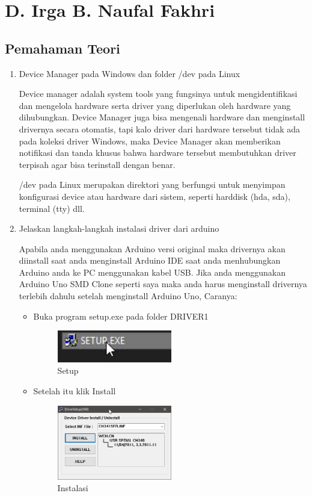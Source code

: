 \section{D. Irga B. Naufal Fakhri}
\subsection{Pemahaman Teori}
\begin{enumerate}
\item Device Manager pada Windows dan folder /dev pada Linux

Device manager adalah system tools yang fungsinya untuk mengidentifikasi dan mengelola hardware serta driver yang diperlukan oleh hardware yang dihubungkan. Device Manager juga bisa mengenali hardware dan menginstall drivernya secara otomatis, tapi kalo driver dari hardware tersebut tidak ada pada koleksi driver Windows, maka Device Manager akan memberikan notifikasi dan tanda khusus bahwa hardware tersebut membutuhkan driver terpisah agar bisa terinstall dengan benar.

/dev pada Linux merupakan direktori yang berfungsi untuk menyimpan konfigurasi device atau hardware dari sistem, seperti harddisk (hda, sda), terminal (tty) dll.

\item Jelaskan langkah-langkah instalasi driver dari arduino

Apabila anda menggunakan Arduino versi original maka drivernya akan diinstall saat anda menginstall Arduino IDE saat anda menhubungkan Arduino anda ke PC menggunakan kabel USB. Jika anda menggunakan Arduino Uno SMD Clone seperti saya maka anda harus menginstall drivernya terlebih dahulu setelah menginstall Arduino Uno, Caranya:
	\begin{itemize}
	\item Buka program setup.exe pada folder DRIVER1
	\begin{figure}[ht!]
		\includegraphics[width=5cm]{figures/5/1174066/0.jpg}
		\centering
		\caption{Setup}
	\end{figure}
	
	\item Setelah itu klik Install
	\begin{figure}[ht!]
		\includegraphics[width=5cm]{figures/5/1174066/1.png}
		\centering
		\caption{Instalasi}
	\end{figure}


\end{itemize}
\end{enumerate}

